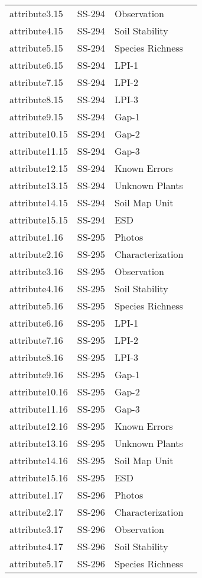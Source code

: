\documentclass[
]{article}
\begin{document}
\begin{longtable}[]{@{}llll@{}}
attribute3.15 & SS-294 & Observation & \\
attribute4.15 & SS-294 & Soil Stability & \\
attribute5.15 & SS-294 & Species Richness & \\
attribute6.15 & SS-294 & LPI-1 & \\
attribute7.15 & SS-294 & LPI-2 & \\
attribute8.15 & SS-294 & LPI-3 & \\
attribute9.15 & SS-294 & Gap-1 & \\
attribute10.15 & SS-294 & Gap-2 & \\
attribute11.15 & SS-294 & Gap-3 & \\
attribute12.15 & SS-294 & Known Errors & \\
attribute13.15 & SS-294 & Unknown Plants & \\
attribute14.15 & SS-294 & Soil Map Unit & \\
attribute15.15 & SS-294 & ESD & \\
attribute1.16 & SS-295 & Photos & \\
attribute2.16 & SS-295 & Characterization & \\
attribute3.16 & SS-295 & Observation & \\
attribute4.16 & SS-295 & Soil Stability & \\
attribute5.16 & SS-295 & Species Richness & \\
attribute6.16 & SS-295 & LPI-1 & \\
attribute7.16 & SS-295 & LPI-2 & \\
attribute8.16 & SS-295 & LPI-3 & \\
attribute9.16 & SS-295 & Gap-1 & \\
attribute10.16 & SS-295 & Gap-2 & \\
attribute11.16 & SS-295 & Gap-3 & \\
attribute12.16 & SS-295 & Known Errors & \\
attribute13.16 & SS-295 & Unknown Plants & \\
attribute14.16 & SS-295 & Soil Map Unit & \\
attribute15.16 & SS-295 & ESD & \\
attribute1.17 & SS-296 & Photos & \\
attribute2.17 & SS-296 & Characterization & \\
attribute3.17 & SS-296 & Observation & \\
attribute4.17 & SS-296 & Soil Stability & \\
attribute5.17 & SS-296 & Species Richness & \\

\end{longtable}
\end{document}
